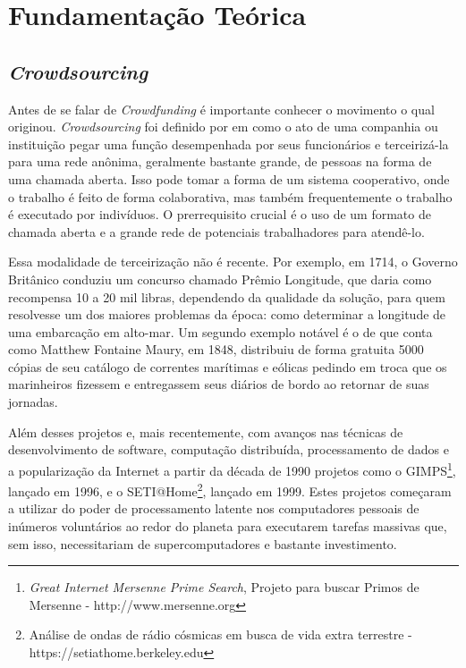 \chapter{Fundamentação Teórica}

\section{\emph{Crowdsourcing}}
Antes de se falar de \emph{Crowdfunding} é importante conhecer o movimento o qual originou. \emph{Crowdsourcing} foi definido por \citeauthor{wired-crowdsource} em \citeyear{wired-crowdsource} como o ato de uma companhia ou instituição pegar uma função desempenhada por seus funcionários e terceirizá-la para uma rede anônima, geralmente bastante grande, de pessoas na forma de uma chamada aberta. Isso pode tomar a forma de um sistema cooperativo, onde o trabalho é feito de forma colaborativa, mas também frequentemente o trabalho é executado por indivíduos. O prerrequisito crucial é o uso de um formato de chamada aberta e a grande rede de potenciais trabalhadores para atendê-lo.

Essa modalidade de terceirização não é recente. Por exemplo, em 1714, o Governo Britânico conduziu um concurso chamado Prêmio Longitude\cite{wiki-longitude_rewards}, que daria como recompensa 10 a 20 mil libras, dependendo da qualidade da solução, para quem resolvesse um dos maiores problemas da época: como determinar a longitude de uma embarcação em alto-mar. Um segundo exemplo notável é o de \citeauthor{hearn2002tracks} que conta como Matthew Fontaine Maury, em 1848, distribuiu de forma gratuita 5000 cópias de seu catálogo de correntes marítimas e eólicas pedindo em troca que os marinheiros fizessem e entregassem seus diários de bordo ao retornar de suas jornadas.

Além desses projetos e, mais recentemente, com avanços nas técnicas de desenvolvimento de software, computação distribuída, processamento de dados e a popularização da Internet a partir da década de 1990 projetos como o GIMPS\footnote{\emph{Great Internet Mersenne Prime Search}, Projeto para buscar Primos de Mersenne - http://www.mersenne.org}, lançado em 1996, e o SETI@Home\footnote{Análise de ondas de rádio cósmicas em busca de vida extra terrestre - https://setiathome.berkeley.edu}, lançado em 1999. Estes projetos começaram a utilizar do poder de processamento latente nos computadores pessoais de inúmeros voluntários ao redor do planeta para executarem tarefas massivas que, sem isso, necessitariam de supercomputadores e bastante investimento.

